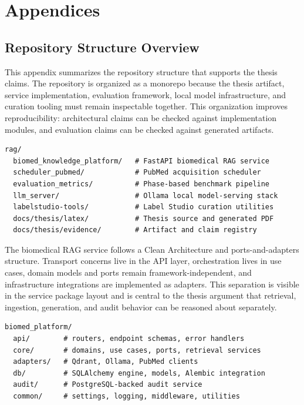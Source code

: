 \chapter{Appendices}

\section{Repository Structure Overview}

This appendix summarizes the repository structure that supports the thesis claims. The repository is organized as a monorepo because the thesis artifact, service implementation, evaluation framework, local model infrastructure, and curation tooling must remain inspectable together. This organization improves reproducibility: architectural claims can be checked against implementation modules, and evaluation claims can be checked against generated artifacts.

\begin{lstlisting}[caption={Repository-level module layout.}]
rag/
  biomed_knowledge_platform/   # FastAPI biomedical RAG service
  scheduler_pubmed/            # PubMed acquisition scheduler
  evaluation_metrics/          # Phase-based benchmark pipeline
  llm_server/                  # Ollama local model-serving stack
  labelstudio-tools/           # Label Studio curation utilities
  docs/thesis/latex/           # Thesis source and generated PDF
  docs/thesis/evidence/        # Artifact and claim registry
\end{lstlisting}

The biomedical RAG service follows a Clean Architecture and ports-and-adapters structure. Transport concerns live in the API layer, orchestration lives in use cases, domain models and ports remain framework-independent, and infrastructure integrations are implemented as adapters. This separation is visible in the service package layout and is central to the thesis argument that retrieval, ingestion, generation, and audit behavior can be reasoned about separately.

\begin{lstlisting}[caption={Biomedical RAG service package boundaries.}]
biomed_platform/
  api/        # routers, endpoint schemas, error handlers
  core/       # domains, use cases, ports, retrieval services
  adapters/   # Qdrant, Ollama, PubMed clients
  db/         # SQLAlchemy engine, models, Alembic integration
  audit/      # PostgreSQL-backed audit service
  common/     # settings, logging, middleware, utilities
\end{lstlisting}

